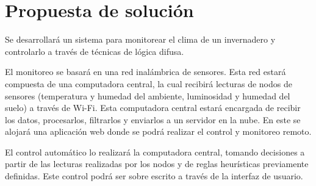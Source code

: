 \section{Propuesta de solución}

Se desarrollará un sistema para monitorear el clima de un invernadero y controlarlo a través de técnicas de lógica difusa.

El monitoreo se basará en una red inalámbrica de sensores. Esta red estará compuesta de una computadora central, la cual recibirá lecturas
de nodos de sensores (temperatura y humedad del ambiente, luminosidad y humedad del suelo) a través de Wi-Fi. Esta computadora central
estará encargada de recibir los datos, procesarlos, filtrarlos y enviarlos a un servidor en la nube. En este se alojará una aplicación web
donde se podrá realizar el control y monitoreo remoto.

El control automático lo realizará la computadora central, tomando decisiones a partir de las lecturas realizadas por los nodos y 
de reglas heurísticas previamente definidas. Este control podrá ser sobre escrito a través de la interfaz de usuario.






